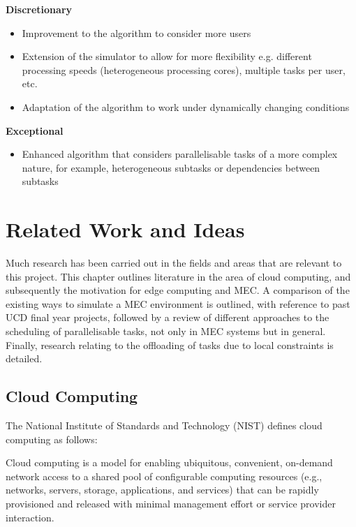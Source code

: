 \documentclass[]{UCD_CS_Interim_Report}
\renewenvironment{leftbar}{%
    \def\FrameCommand{%
        {\color{gray}\vrule width 1pt}%
        \hspace{12pt}%
    }%
    \MakeFramed{%
        \advance\hsize-\width
        \FrameRestore
        \setlength{\parskip}{0pt}%
    }%
    \itshape
    \vspace{8pt}%
}{%
    \par\vspace{8pt}%
    \endMakeFramed
    \vspace{-\parskip}%
}
\begin{document}
\textbf{Discretionary}
\vspace{-1.5em}
\begin{itemize}
    \item Improvement to the algorithm to consider more users
    \item Extension of the simulator to allow for more flexibility e.g. different processing speeds (heterogeneous processing cores), multiple tasks per user, etc.
    \item Adaptation of the algorithm to work under dynamically changing conditions
\end{itemize}
\vspace{-0.5em}

\textbf{Exceptional}
\vspace{-1.5em}
\begin{itemize}
    \item Enhanced algorithm that considers parallelisable tasks of a more complex nature, for
example, heterogeneous subtasks or dependencies between subtasks
\end{itemize}

\chapter{Related Work and Ideas} \label{litreview}
Much research has been carried out in the fields and areas that are relevant to this project. This chapter outlines literature in the area of cloud computing, and subsequently the motivation for edge computing and MEC. A comparison of the existing ways to simulate a MEC environment is outlined, with reference to past UCD final year projects, followed by a review of different approaches to the scheduling of parallelisable tasks, not only in MEC systems but in general. Finally, research relating to the offloading of tasks due to local constraints is detailed.

\section{Cloud Computing}
The National Institute of Standards and Technology (NIST) \cite{mell2011nist} defines cloud computing as follows:

\begin{leftbar}
    Cloud computing is a model for enabling ubiquitous, convenient, on-demand network access to a shared pool of configurable computing resources (e.g., networks, servers, storage, applications, and services) that can be rapidly provisioned and released with minimal management effort or service provider interaction. 
\end{leftbar}
\end{document}
